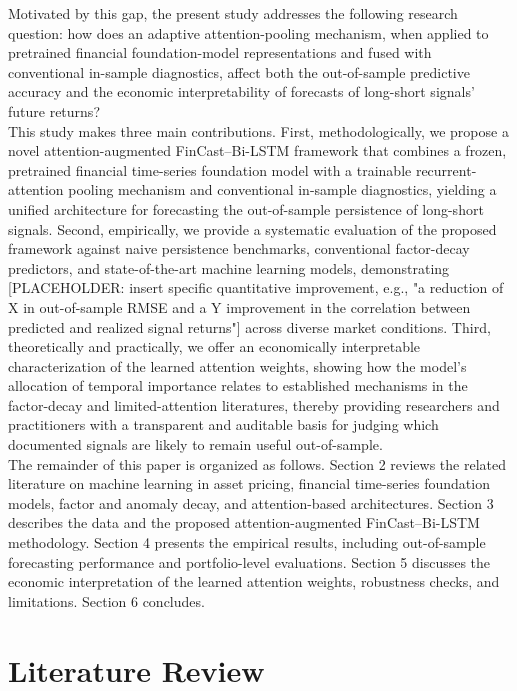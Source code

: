 \documentclass[pdflatex,sn-mathphys-num]{sn-jnl}%
\theoremstyle{thmstyleone}%
\theoremstyle{thmstyletwo}%
\theoremstyle{thmstylethree}%
\begin{document}
Motivated by this gap, the present study addresses the following research question: how does an adaptive attention-pooling mechanism, when applied to pretrained financial foundation-model representations and fused with conventional in-sample diagnostics, affect both the out-of-sample predictive accuracy and the economic interpretability of forecasts of long-short signals' future returns?\\

This study makes three main contributions. First, methodologically, we propose a novel attention-augmented FinCast–Bi-LSTM framework that combines a frozen, pretrained financial time-series foundation model with a trainable recurrent-attention pooling mechanism and conventional in-sample diagnostics, yielding a unified architecture for forecasting the out-of-sample persistence of long-short signals. Second, empirically, we provide a systematic evaluation of the proposed framework against naive persistence benchmarks, conventional factor-decay predictors, and state-of-the-art machine learning models, demonstrating [PLACEHOLDER: insert specific quantitative improvement, e.g., "a reduction of X in out-of-sample RMSE and a Y improvement in the correlation between predicted and realized signal returns"] across diverse market conditions. Third, theoretically and practically, we offer an economically interpretable characterization of the learned attention weights, showing how the model's allocation of temporal importance relates to established mechanisms in the factor-decay and limited-attention literatures, thereby providing researchers and practitioners with a transparent and auditable basis for judging which documented signals are likely to remain useful out-of-sample.\\

The remainder of this paper is organized as follows. Section 2 reviews the related literature on machine learning in asset pricing, financial time-series foundation models, factor and anomaly decay, and attention-based architectures. Section 3 describes the data and the proposed attention-augmented FinCast–Bi-LSTM methodology. Section 4 presents the empirical results, including out-of-sample forecasting performance and portfolio-level evaluations. Section 5 discusses the economic interpretation of the learned attention weights, robustness checks, and limitations. Section 6 concludes.

\section{Literature Review}\label{sec2}
\end{document}
